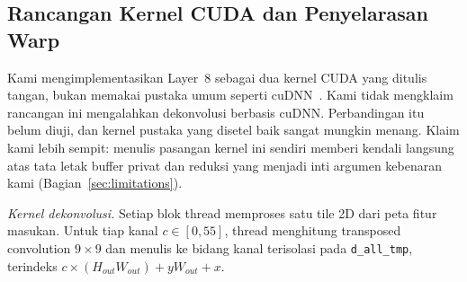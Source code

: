 \documentclass[conference]{IEEEtran}
\begin{document}
\begin{table}[htbp]
\caption{Spesifikasi Perangkat Keras: GB10 (GX10) vs. Desktop RTX 4090}
\label{tab:hardware}
\centering
{}
\end{table}

\subsection{Rancangan Kernel CUDA dan Penyelarasan Warp}
Kami mengimplementasikan Layer~8 sebagai dua kernel CUDA yang ditulis tangan, bukan memakai pustaka umum seperti cuDNN~\cite{chetlur2014cudnn}. Kami tidak mengklaim rancangan ini mengalahkan dekonvolusi berbasis cuDNN. Perbandingan itu belum diuji, dan kernel pustaka yang disetel baik sangat mungkin menang. Klaim kami lebih sempit: menulis pasangan kernel ini sendiri memberi kendali langsung atas tata letak buffer privat dan reduksi yang menjadi inti argumen kebenaran kami (Bagian~\ref{sec:limitations}).

\emph{Kernel dekonvolusi.} Setiap blok thread memproses satu tile 2D dari peta fitur masukan. Untuk tiap kanal $c \in [0,55]$, thread menghitung transposed convolution $9{\times}9$ dan menulis ke bidang kanal terisolasi pada \texttt{d\_all\_tmp}, terindeks $c \times (H_{out}W_{out}) + yW_{out} + x$.
\end{document}
